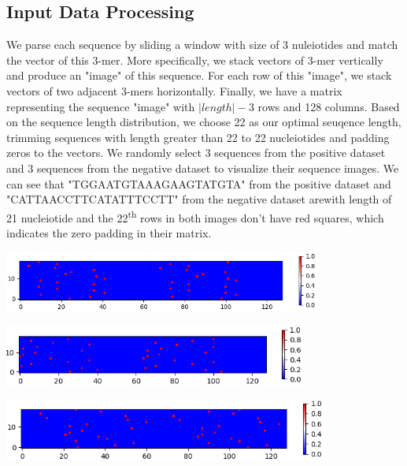 \documentclass[letterpaper, 11pt]{article}
\newenvironment{Figure}
  {\par\medskip\noindent\minipage{\linewidth}}
  {\endminipage\par\medskip}
\begin{document}
\begin{multicols*}{2}
{\subsection{Input Data Processing}
We parse each sequence by sliding a window with size of 3 nuleiotides and match the vector of this 3-mer. More specifically, we stack vectors of 3-mer vertically and produce an "image" of this sequence. For each row of this "image", we stack vectors of two adjacent 3-mers horizontally. Finally, we have a matrix representing the sequence "image" with $|length|-3$ rows and 128 columns. Based on the sequence length distribution, we choose 22 as our optimal seuqence length, trimming sequences with length greater than 22 to 22 nucleiotides and padding zeros to the vectors. We randomly select 3 sequences from the positive dataset and 3 sequences from the negative dataset to visualize their sequence images. We can see that "TGGAATGTAAAGAAGTATGTA" from the positive dataset and "CATTAACCTTCATATTTCCTT" from the negative dataset arewith length of 21 nucleiotide and the 22\textsuperscript{th} rows in both images don't have red squares, which indicates the zero padding in their matrix.
\begin{Figure}
\includegraphics[height=2cm, width=\textwidth]{pos1.png}
\end{Figure} 
\begin{Figure}
\includegraphics[height=2cm, width=\textwidth]{pos2.png}
\end{Figure} 
\begin{Figure}
\includegraphics[height=2cm, width=\textwidth]{pos3.png}

\end{Figure}}
\end{multicols*}
\end{document}

